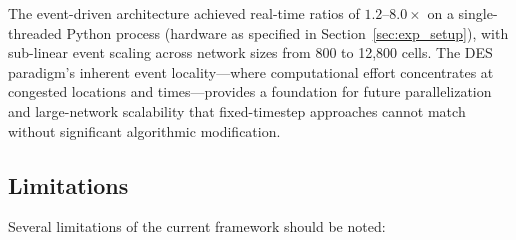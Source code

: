 \documentclass[review,authoryear]{elsarticle}
\begin{document}
The event-driven architecture achieved real-time ratios of $1.2$--$8.0\times$ on a single-threaded Python process (hardware as specified in Section~\ref{sec:exp_setup}), with sub-linear event scaling across network sizes from 800 to 12{,}800 cells. The DES paradigm's inherent event locality---where computational effort concentrates at congested locations and times---provides a foundation for future parallelization and large-network scalability that fixed-timestep approaches cannot match without significant algorithmic modification.

\subsection{Limitations}

Several limitations of the current framework should be noted:
\end{document}
